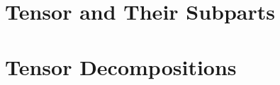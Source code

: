 
\section{Tensor and Their Subparts} \label{sec:Tensor and Their Subparts}
    

\section{Tensor Decompositions} \label{sec:Tensor Decompositions}
    